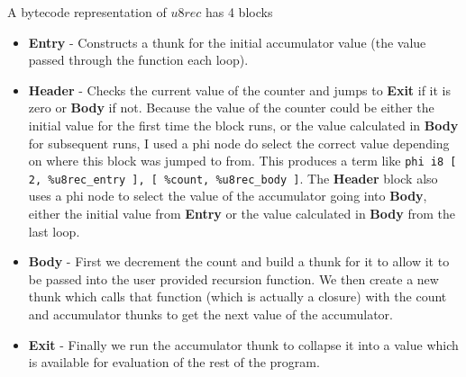 A bytecode representation of $u8rec$ has 4 blocks
\begin{itemize}
    \item \textbf{Entry} -
    Constructs a thunk for the initial accumulator value (the value passed through the function each loop).
    \item \textbf{Header} -
    Checks the current value of the counter and jumps to \textbf{Exit} if it is zero or \textbf{Body} if not.
    Because the value of the counter could be either the initial value for the first time the block
    runs, or the value calculated in \textbf{Body} for subsequent runs, I used a phi node do select
    the correct value depending on where this block was jumped to from.
    This produces a term like\newline
    \texttt{phi i8 [ 2, \%u8rec\_entry ], [ \%count, \%u8rec\_body ]}.\newline
    The \textbf{Header} block also uses a phi node to select the value of the accumulator going into
    \textbf{Body}, either the initial value from \textbf{Entry} or the value calculated in \textbf{Body}
    from the last loop.
    \item \textbf{Body} -
    First we decrement the count and build a thunk for it to allow it to be passed into the user provided
    recursion function.
    We then create a new thunk which calls that function (which is actually a closure) with the count
    and accumulator thunks to get the next value of the accumulator.
    \item \textbf{Exit} -
    Finally we run the accumulator thunk to collapse it into a value which is available for evaluation
    of the rest of the program.
\end{itemize}
